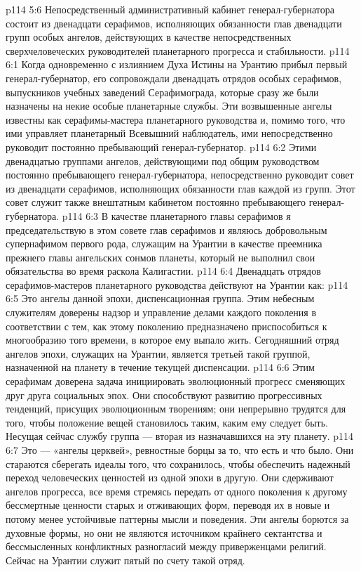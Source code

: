 \vs p114 5:6 Непосредственный административный кабинет генерал\hyp{}губернатора состоит из двенадцати серафимов, исполняющих обязанности глав двенадцати групп особых ангелов, действующих в качестве непосредственных сверхчеловеческих руководителей планетарного прогресса и стабильности.
\vs p114 6:1 Когда одновременно с излиянием Духа Истины на Урантию прибыл первый генерал\hyp{}губернатор, его сопровождали двенадцать отрядов особых серафимов, выпускников учебных заведений Серафимограда, которые сразу же были назначены на некие особые планетарные службы. Эти возвышенные ангелы известны как серафимы\hyp{}мастера планетарного руководства и, помимо того, что ими управляет планетарный Всевышний наблюдатель, ими непосредственно руководит постоянно пребывающий генерал\hyp{}губернатор.
\vs p114 6:2 Этими двенадцатью группами ангелов, действующими под общим руководством постоянно пребывающего генерал\hyp{}губернатора, непосредственно руководит совет из двенадцати серафимов, исполняющих обязанности глав каждой из групп. Этот совет служит также внештатным кабинетом постоянно пребывающего генерал\hyp{}губернатора.
\vs p114 6:3 В качестве планетарного главы серафимов я председательствую в этом совете глав серафимов и являюсь добровольным супернафимом первого рода, служащим на Урантии в качестве преемника прежнего главы ангельских сонмов планеты, который не выполнил свои обязательства во время раскола Калигастии.
\vs p114 6:4 Двенадцать отрядов серафимов\hyp{}мастеров планетарного руководства действуют на Урантии как:
\vs p114 6:5 \bibnobreakspace {} Это ангелы данной эпохи, диспенсационная группа. Этим небесным служителям доверены надзор и управление делами каждого поколения в соответствии с тем, как этому поколению предназначено приспособиться к многообразию того времени, в которое ему выпало жить. Сегодняшний отряд ангелов эпохи, служащих на Урантии, является третьей такой группой, назначенной на планету в течение текущей диспенсации.
\vs p114 6:6 \pc {}\bibnobreakspace {} Этим серафимам доверена задача инициировать эволюционный прогресс сменяющих друг друга социальных эпох. Они способствуют развитию прогрессивных тенденций, присущих эволюционным творениям; они непрерывно трудятся для того, чтобы положение вещей становилось таким, каким ему следует быть. Несущая сейчас службу группа --- вторая из назначавшихся на эту планету.
\vs p114 6:7 \pc {}\bibnobreakspace {} Это --- «ангелы церквей», ревностные борцы за то, что есть и что было. Они стараются сберегать идеалы того, что сохранилось, чтобы обеспечить надежный переход человеческих ценностей из одной эпохи в другую. Они сдерживают ангелов прогресса, все время стремясь передать от одного поколения к другому бессмертные ценности старых и отживающих форм, переводя их в новые и потому менее устойчивые паттерны мысли и поведения. Эти ангелы борются за духовные формы, но они не являются источником крайнего сектантства и бессмысленных конфликтных разногласий между приверженцами религий. Сейчас на Урантии служит пятый по счету такой отряд.
